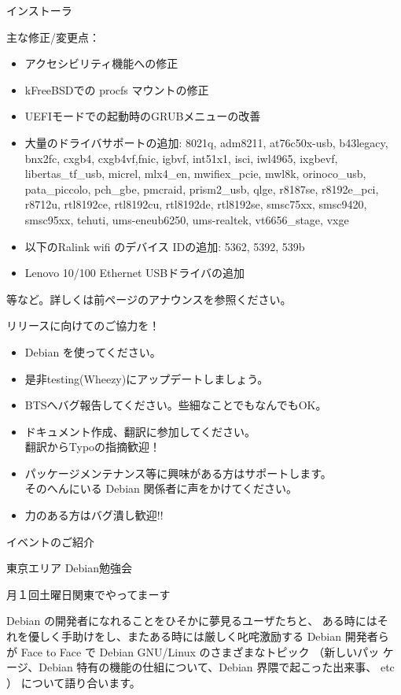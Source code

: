 \begin{frame}{インストーラ}

 主な修正/変更点：
\begin{itemize}
\item アクセシビリティ機能への修正
\item kFreeBSDでの procfs マウントの修正
\item UEFIモードでの起動時のGRUBメニューの改善
\item 大量のドライバサポートの追加: 8021q, adm8211, at76c50x-usb, b43legacy, bnx2fc, cxgb4, cxgb4vf,fnic, igbvf, int51x1, isci, iwl4965, ixgbevf, libertas\_tf\_usb, micrel, mlx4\_en, mwifiex\_pcie, mwl8k, orinoco\_usb, pata\_piccolo, pch\_gbe, pmcraid, prism2\_usb, qlge, r8187se, r8192e\_pci, r8712u, rtl8192ce, rtl8192cu, rtl8192de, rtl8192se, smsc75xx, smsc9420, smsc95xx, tehuti, ums-eneub6250, ums-realtek, vt6656\_stage, vxge
\item 以下のRalink wifi のデバイス IDの追加: 5362, 5392, 539b
\item Lenovo 10/100 Ethernet USBドライバの追加
\end{itemize}
等など。詳しくは前ページのアナウンスを参照ください。

\end{frame}


\begin{frame}{リリースに向けてのご協力を！}
\begin{itemize}
 \item Debian を使ってください。
 \item 是非testing(Wheezy)にアップデートしましょう。
 \item BTSへバグ報告してください。些細なことでもなんでもOK。
 \item ドキュメント作成、翻訳に参加してください。\\
翻訳からTypoの指摘歓迎！
 \item パッケージメンテナンス等に興味がある方はサポートします。\\
そのへんにいる Debian 関係者に声をかけてください。
 \item 力のある方はバグ潰し歓迎!!
\end{itemize}
\end{frame}


\begin{frame}
\begin{center}
\LARGE{イベントのご紹介}
\end{center}
\end{frame}

\begin{frame}{東京エリア Debian勉強会}

\begin{center}
\Large
月１回土曜日関東でやってまーす
\end{center}

 Debian の開発者になれることをひそかに夢見るユーザたちと、 ある時にはそ
れを優しく手助けをし、またある時には厳しく叱咤激励する Debian 開発者ら
が Face to Face で Debian GNU/Linux のさまざまなトピック （新しいパッ
ケージ、Debian 特有の機能の仕組について、Debian 界隈で起こった出来事、
 etc ） について語り合います。

\end{frame}

